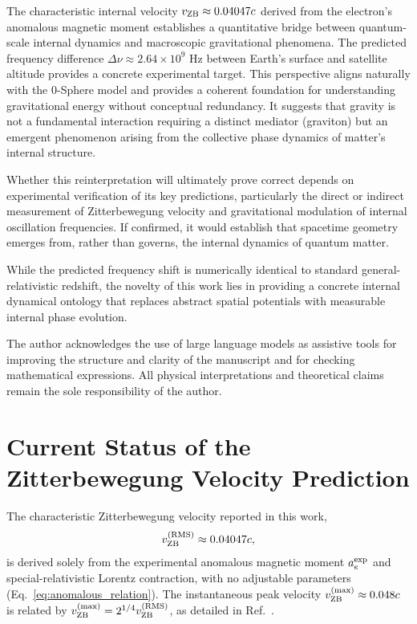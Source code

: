 \documentclass[%
 reprint,
 amsmath,amssymb,
 aps,
 prb,
]{revtex4-2}
\numberwithin{equation}{section}
\begin{document}
The characteristic internal velocity $v_{\rm ZB} \approx 0.04047c$ derived from the electron's anomalous magnetic moment establishes a quantitative bridge between quantum-scale internal dynamics and macroscopic gravitational phenomena. The predicted frequency difference $\Delta\nu \approx 2.64 \times 10^9$ Hz between Earth's surface and satellite altitude provides a concrete experimental target. This perspective aligns naturally with the 0-Sphere model and provides a coherent foundation for understanding gravitational energy without conceptual redundancy. It suggests that gravity is not a fundamental interaction requiring a distinct mediator (graviton) but an emergent phenomenon arising from the collective phase dynamics of matter's internal structure.

Whether this reinterpretation will ultimately prove correct depends on experimental verification of its key predictions, particularly the direct or indirect measurement of Zitterbewegung velocity and gravitational modulation of internal oscillation frequencies. If confirmed, it would establish that spacetime geometry emerges from, rather than governs, the internal dynamics of quantum matter.

While the predicted frequency shift is numerically identical to standard general-relativistic redshift, the novelty of this work lies in providing a concrete internal dynamical ontology that replaces abstract spatial potentials with measurable internal phase evolution.

\begin{acknowledgments}
The author acknowledges the use of large language models as assistive tools for improving the structure and clarity of the manuscript and for checking mathematical expressions. All physical interpretations and theoretical claims remain the sole responsibility of the author.
\end{acknowledgments}

\appendix

\section{Current Status of the Zitterbewegung Velocity Prediction}
\label{app:status}

The characteristic Zitterbewegung velocity reported in this work,
\[
v_{\rm ZB}^{\rm (RMS)} \approx 0.04047c,
\]
is derived solely from the experimental anomalous magnetic moment $a_e^{\rm exp}$ and special-relativistic Lorentz contraction, with no adjustable parameters (Eq.~\ref{eq:anomalous_relation}). The instantaneous peak velocity $v_{\rm ZB}^{\rm (max)} \approx 0.048c$ is related by $v_{\rm ZB}^{\rm (max)} = 2^{1/4} v_{\rm ZB}^{\rm (RMS)}$, as detailed in Ref.~\cite{Hanamura2026NonPert}.
\end{document}
